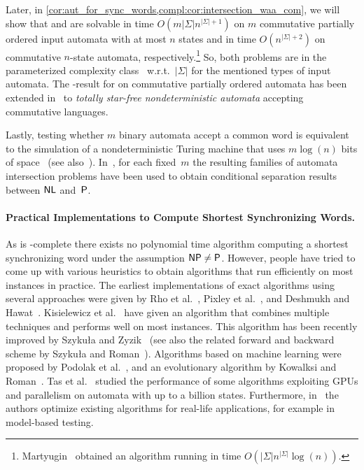 Later, in \cref{cor:aut_for_sync_words,compl:cor:intersection_waa_com},
we will show
that \DFAINT and \DFASWS 
are solvable in time $O(m|\Sigma|n^{|\Sigma|+1})$ on  $m$ commutative partially ordered input automata with at most $n$ states
and in time $O(n^{|\Sigma|+2})$
on commutative $n$-state automata, respectively.\footnote{Martyugin~\cite{Mar2009b} obtained an algorithm running in time 
	$O(|\Sigma|n^{|\Sigma|}\log(n))$.}
So, both problems are in the parameterized complexity class \XP\ w.r.t.~$|\Sigma|$
for the mentioned types of input automata.
The \XP-result for \DFAINT on commutative partially ordered automata
has been extended in~\cite{Arrighi2021}
to  \emph{totally star-free nondeterministic automata} 
accepting commutative languages.


Lastly, testing whether $m$ binary automata accept a common word
is equivalent to the simulation of a nondeterministic Turing machine
that uses $m \log(n)$ bits of space~\cite{DBLP:journals/mst/KasaiI85} (see also~\cite{Galil76,DBLP:journals/tcs/KarakostasLV03,DBLP:conf/mfcs/LangeR92,Wehar2014hardness,Wehar2016}).
In~\cite{DBLP:journals/tcs/KarakostasLV03,Wehar2014hardness}, for each fixed~$m$
the resulting families of automata intersection problems have been used to obtain conditional separation results between $\textup{\textsf{NL}}$ and~$\textup{\textsf{P}}$.	


\paragraph{Practical Implementations to Compute Shortest Synchronizing Words.}
As \DFASWS is \NP-complete
there exists no polynomial time algorithm computing a shortest synchronizing word
under the assumption $\textup{\textsf{NP}} \ne \textup{\textsf{P}}$.
However, people have tried to come up with various heuristics to obtain
algorithms that run efficiently
on most instances in practice.
The earliest implementations of exact
algorithms using several approaches were given
by Rho et al.~\cite{DBLP:conf/dac/RhoSP93},
Pixley et al.~\cite{DBLP:journals/tcad/PixleyJH94},
and Deshmukh and Hawat~\cite{Deshmukh94}.
Kisielewicz et al.~\cite{KisKowSzy2015}
have given an algorithm that combines multiple techniques and performs
well on most instances.
This algorithm
has been recently improved by Szyku\l a and Zyzik~\cite{DBLP:conf/esa/SzykulaZ22} (see also the related forward and backward scheme
by Szyku\l a and Roman~\cite{DBLP:journals/eswa/RomanS15}).
Algorithms
based on machine learning were proposed
by Podolak et al.~\cite{DBLP:conf/icaisc/PodolakRJ12,DBLP:journals/eswa/PodolakRSZ18},
and an evolutionary algorithm by Kowalksi and Roman~\cite{DBLP:conf/evoW/KowalskiR17}.
Tas et al.~\cite{DBLP:journals/isci/TasKY21} studied
the performance of some algorithms exploiting GPUs and parallelism on automata with up to a billion states.
Furthermore, in~\cite{DBLP:conf/modelsward/CirisciSSKKY18,DBLP:journals/eswa/KarahodaKY18,DBLP:journals/eswa/SaracAAKKY21}
the authors optimize existing
algorithms for real-life applications, for example in model-based testing.


